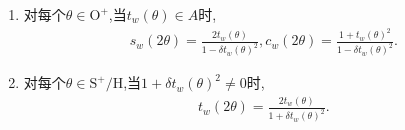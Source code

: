 \begin{corollary}{}{}
	\begin{enumerate}
		\item 对每个$\theta\in\mathrm{O}^{+}$,当$t_{w}\left(\theta\right)\in A$时,
		\begin{align}
			s_{w}\left(2\theta\right)=\frac{2t_{w}\left(\theta\right)}{1-\delta t_{w}\left(\theta\right)^{2}},
			c_{w}\left(2\theta\right)=\frac{1+t_{w}\left(\theta\right)^{2}}{1-\delta t_{w}\left(\theta\right)^{2}}.
		\end{align}
		\item 对每个$\theta\in\mathrm{S}^{+}/\mathrm{H}$,当$1+\delta t_{w}\left(\theta\right)^{2}\neq 0$时,
		\begin{align}
			t_{w}\left(2\theta\right)=\frac{2t_{w}\left(\theta\right)}{1+\delta t_{w}\left(\theta\right)^{2}}.
		\end{align}
	\end{enumerate}
\end{corollary}
































